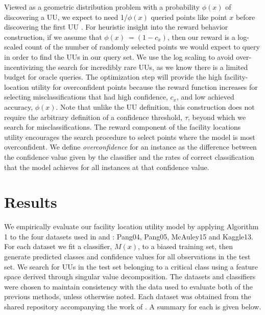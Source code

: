 \documentclass[conference]{IEEEtran}
\begin{document}
Viewed as a geometric distribution problem with a probability $\phi(x)$ of discovering a UU, we expect to need 1/$\phi(x)$ queried points like point $x$ before discovering the first UU \citep{casella2002statistical}.  For heuristic insight into the reward behavior construction, if we assume that   $\phi(x) ~= (1-c_x )$, then our reward is a log-scaled count of the number of randomly selected points we would expect to query in order to find the UUs in our query set. We use the log scaling to avoid over-incentivizing the search for incredibly rare UUs, as we know there is a limited budget for oracle queries. The optimization step will provide the high facility-location utility for overconfident points because the reward function increases for selecting misclassifications that had high confidence, $c_x$, and low achieved accuracy, $\phi(x)$. Note that unlike the UU definition, this construction does not require the arbitrary definition of a confidence threshold, $\tau$, beyond which we search for misclassifications. The reward component of the facility locations utility encourages the search procedure to select points where the model is most overconfident. We define \textit{overconfidence} for an instance as the difference between the confidence value given by the classifier and the rates of correct classification that the model achieves for all instances at that confidence value. 



\section{Results}

We empirically evaluate our facility location utility model by applying Algorithm 1 to the four datasets used in \cite{Lakkaraju2016} and \cite{Bansal2018}: Pang04, Pang05, McAuley15 and Kaggle13.  For each dataset we fit a classifier, $M(x)$, to a biased training set, then generate predicted classes and confidence values for all observations in the test set.  We search for UUs in the test set belonging to a critical class using a feature space derived through singular value decomposition.  The datasets and classifiers were chosen to maintain consistency with the data used to evaluate both of the previous methods, unless otherwise noted.  Each dataset was obtained from the shared repository accompanying the work of \cite{Bansal2018}.  A summary for each is given below.    
\end{document}
